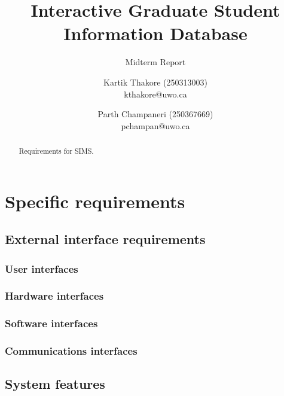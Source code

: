 \documentclass{journal}
\begin{document}

\nocite{*}
\title{Interactive Graduate Student Information Database}
\subtitle{Midterm Report} 
\author{Kartik Thakore (250313003)\\kthakore@uwo.ca \and Parth Champaneri (250367669)\\pchampan@uwo.ca}
\maketitle

\begin{abstract}
Requirements for SIMS.

\end{abstract}

\section{Specific requirements}
\subsection{External interface requirements}
\subsubsection{User interfaces}
\subsubsection{Hardware interfaces}
\subsubsection{Software interfaces}
\subsubsection{Communications interfaces}
\subsection{System features}
\end{document}
